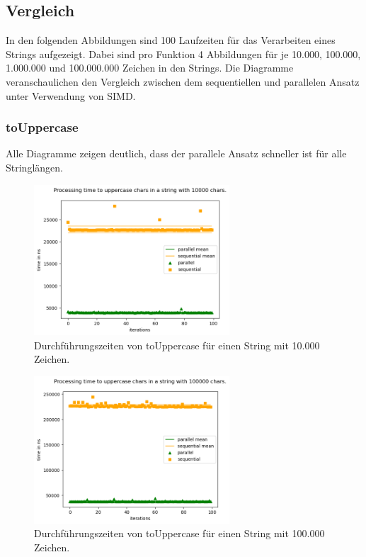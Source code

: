 \documentclass[plainarticle,zihtitle,german,final,hyperref,utf8]{zihpub}
\begin{document}
\newpage
\subsection{Vergleich}
In den folgenden Abbildungen sind 100 Laufzeiten für das Verarbeiten eines Strings aufgezeigt. Dabei sind pro Funktion 4 Abbildungen für je 10.000, 100.000, 1.000.000 und 100.000.000 Zeichen in den Strings. Die Diagramme veranschaulichen den Vergleich zwischen dem sequentiellen und parallelen Ansatz unter Verwendung von SIMD.
\subsubsection{toUppercase}
Alle Diagramme zeigen deutlich, dass der parallele Ansatz schneller ist für alle Stringlängen.
\begin{figure}[h]
	\begin{center}
		\includegraphics[width=0.65\textwidth]{images/comp_upper_10000.png}
		\caption{Durchführungszeiten von toUppercase für einen String mit 10.000 Zeichen.}
	\end{center}
\end{figure}
\begin{figure}[h]
\begin{center}
	\includegraphics[width=0.65\textwidth]{images/comp_upper_100000.png}
	\caption{Durchführungszeiten von toUppercase für einen String mit 100.000 Zeichen.}
\end{center}
\end{figure}
\end{document}
